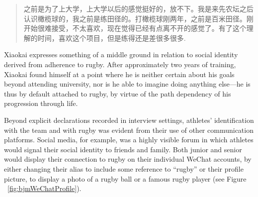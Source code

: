 \begin{CJK}{UTF8}{gbsn}
           \begin{quote}
               之前是为了上大学，上大学以后的感觉挺好的，放不下。我是来先农坛之后认识橄榄球的，我之前是练田径的。打橄榄球刚两年，之前是百米田径。刚开始很难接受，不太喜欢，现在觉得已经有点离不开的感觉了。有了这个理解的时间，喜欢这个项目，但是练得还是差很多很多.
           \end{quote}

Xiaokai expresses something of a middle ground in relation to social identity derived from adherence to rugby.  After approximately two years of training, Xiaokai found himself at a point where he is neither certain about his goals beyond attending university, nor is he able to imagine doing anything else---he is thus by default attached to rugby, by virtue of the path dependency of his progression through life.

Beyond explicit declarations recorded in interview settings, athletes' identification with the team and with rugby was evident from their use of other communication platforms.  Social media, for example, was a highly visible forum in which athletes would signal their social identity to friends and family.  Both junior and senior would display their connection to rugby on their individual WeChat accounts, by either changing their alias to include some reference to ``rugby'' or their profile picture, to display a photo of a rugby ball or a famous rugby player (see Figure ~\ref{fig:bjmWeChatProfile}).


\end{CJK}
